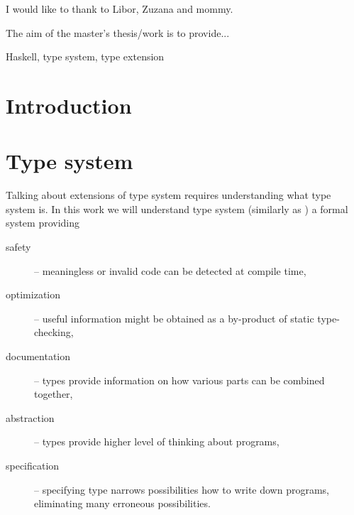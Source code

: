 \documentclass[11pt,oneside,draft]{fithesis2}
\renewcommand{\to}{\mathrel{\mathop{\chemarrow}}}
\theoremstyle{definition}
\begin{document}
\FrontMatter
\ThesisTitlePage

\begin{ThesisDeclaration}
\DeclarationText
\AdvisorName
\end{ThesisDeclaration}

\begin{ThesisThanks}
I would like to thank to Libor, Zuzana and mommy.
\end{ThesisThanks}

\begin{ThesisAbstract}
The aim of the master's thesis/work is to provide...
\end{ThesisAbstract}

\begin{ThesisKeyWords}
Haskell, type system, type extension
\end{ThesisKeyWords}

\clearpage
{}
{}
\tableofcontents

\clearpage
{}
{}
\listoffigures

\MainMatter

\chapter{Introduction}

\chapter{Type system}


Talking about extensions of type system requires understanding what type system is.
In this work we will understand type system (similarly as
\cite{pierce:2002:types,barendregt:1992:lambdaProc}) a formal system providing

\begin{description}
	\item[safety] -- meaningless or invalid code can be detected at compile time,
	\item[optimization] -- useful information might be obtained as a by-product of static type-checking,
	\item[documentation] -- types provide information on how various parts can be combined together,
	\item[abstraction] -- types provide higher level of thinking about programs,
	\item[specification] -- specifying type narrows possibilities how to write down programs,
		eliminating many erroneous possibilities.
\end{description}
\end{document}
